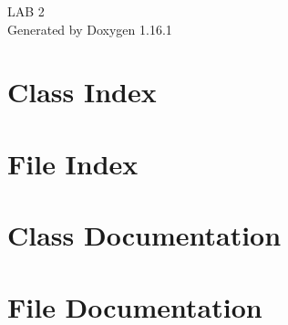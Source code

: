 \documentclass[twoside]{book}
\newcommand{\+}{\discretionary{\mbox{\scriptsize$\hookleftarrow$}}{}{}}
\newcommand{\clearemptydoublepage}{%
    \newpage{\pagestyle{empty}\cleardoublepage}%
  }
\begin{document}
  \raggedbottom
    \hypersetup{pageanchor=false,
                bookmarksnumbered=true,
                pdfencoding=unicode
               }
  \begin{titlepage}
  \vspace*{7cm}
  \begin{center}%
  {\Large LAB 2}\\
  \vspace*{1cm}
  {\large Generated by Doxygen 1.16.1}\\
  \end{center}
  \end{titlepage}
  \clearemptydoublepage
  \tableofcontents
  \clearemptydoublepage
  \hypersetup{pageanchor=true}

\chapter{Class Index}

\chapter{File Index}

\chapter{Class Documentation}



\chapter{File Documentation}



  \backmatter
  \newpage
  \clearemptydoublepage
  \printindex
\end{document}
